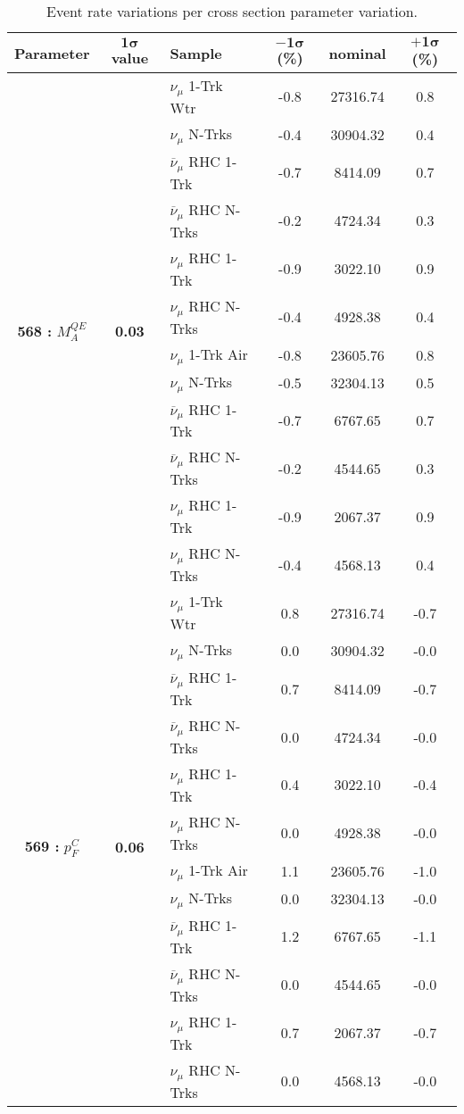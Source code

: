 \addtocounter{table}{-1}
\begin{table}[ht!]
\centering
\begin{tabular}{ c  c  l  c  c  c }
\midrule[1.3pt]
\textbf{Parameter} & \textbf{$\mathbf{1\sigma}$ value} & \textbf{Sample} & \textbf{$\mathbf{-1\sigma}$ (\%)}  &  \textbf{nominal}  &  \textbf{$\mathbf{+1\sigma}$ (\%)} \\
\midrule[1.3pt]
\multirow{12}{*}{\textbf{568 : }$M_A^{QE}$} & \multirow{12}{*}{\textbf{0.03}} & $\nu_\mu$ 1-Trk Wtr &   -0.8 &  27316.74 &   0.8 \\ 
 &  & $\nu_\mu$ N-Trks &   -0.4 &  30904.32 &   0.4 \\ 
 &  & $\overline{\nu}_\mu$ RHC 1-Trk &   -0.7 &  8414.09 &   0.7 \\ 
 &  & $\overline{\nu}_\mu$ RHC N-Trks &   -0.2 &  4724.34 &   0.3 \\ 
 &  & $\nu_\mu$ RHC 1-Trk &   -0.9 &  3022.10 &   0.9 \\ 
 &  & $\nu_\mu$ RHC N-Trks &   -0.4 &  4928.38 &   0.4 \\ 
 &  & $\nu_\mu$ 1-Trk Air &   -0.8 &  23605.76 &   0.8 \\ 
 &  & $\nu_\mu$ N-Trks &   -0.5 &  32304.13 &   0.5 \\ 
 &  & $\overline{\nu}_\mu$ RHC 1-Trk &   -0.7 &  6767.65 &   0.7 \\ 
 &  & $\overline{\nu}_\mu$ RHC N-Trks &   -0.2 &  4544.65 &   0.3 \\ 
 &  & $\nu_\mu$ RHC 1-Trk &   -0.9 &  2067.37 &   0.9 \\ 
 &  & $\nu_\mu$ RHC N-Trks &   -0.4 &  4568.13 &   0.4 \\ 
\midrule[1.3pt]
\multirow{12}{*}{\textbf{569 : }$p_F^C$} & \multirow{12}{*}{\textbf{0.06}} & $\nu_\mu$ 1-Trk Wtr &   0.8 &  27316.74 &   -0.7 \\ 
 &  & $\nu_\mu$ N-Trks &   0.0 &  30904.32 &   -0.0 \\ 
 &  & $\overline{\nu}_\mu$ RHC 1-Trk &   0.7 &  8414.09 &   -0.7 \\ 
 &  & $\overline{\nu}_\mu$ RHC N-Trks &   0.0 &  4724.34 &   -0.0 \\ 
 &  & $\nu_\mu$ RHC 1-Trk &   0.4 &  3022.10 &   -0.4 \\ 
 &  & $\nu_\mu$ RHC N-Trks &   0.0 &  4928.38 &   -0.0 \\ 
 &  & $\nu_\mu$ 1-Trk Air &   1.1 &  23605.76 &   -1.0 \\ 
 &  & $\nu_\mu$ N-Trks &   0.0 &  32304.13 &   -0.0 \\ 
 &  & $\overline{\nu}_\mu$ RHC 1-Trk &   1.2 &  6767.65 &   -1.1 \\ 
 &  & $\overline{\nu}_\mu$ RHC N-Trks &   0.0 &  4544.65 &   -0.0 \\ 
 &  & $\nu_\mu$ RHC 1-Trk &   0.7 &  2067.37 &   -0.7 \\ 
 &  & $\nu_\mu$ RHC N-Trks &   0.0 &  4568.13 &   -0.0 \\ 
\midrule[1.3pt]
\end{tabular}
\centering
\caption*{Event rate variations per cross section parameter variation.}
\end{table}
